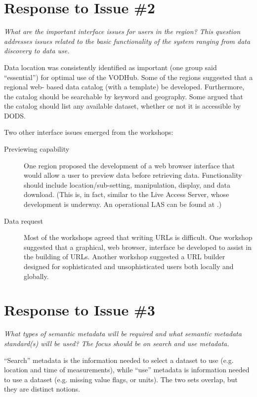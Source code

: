 \documentclass{report}
\newcommand{\pause}{\vspace{10pt}}
\begin{document}
\section{Response to Issue \#2}

\emph{What are the important interface issues for users in the region?  This
question addresses issues related to the basic functionality of the
system ranging from data discovery to data use.}\pause

Data location was consistently identified as important (one group said
``essential'') for optimal use of the VODHub.  Some of the regions
suggested that a regional web- based data catalog (with a template) be
developed.  Furthermore, the catalog should be searchable by keyword
and geography.  Some argued that the catalog should list any available
dataset, whether or not it is accessible by DODS.

Two other interface issues emerged from the workshops:

\begin{description}
\item[Previewing capability]  One region proposed the development of a
  web browser interface that would allow a user to preview data before
  retrieving data.  Functionality should include location/sub-setting,
  manipulation, display, and data download.  (This is, in fact,
  similar to the Live Access Server, whose development is underway.
  An operational LAS can be found at
  .)
  
\item[Data request] Most of the workshops agreed that writing URLs is
  difficult.  One workshop suggested that a graphical, web browser,
  interface be developed to assist in the building of URLs.  Another
  workshop suggested a URL builder designed for sophisticated and
  unsophisticated users both locally and globally.

\end{description}

\section{Response to Issue \#3}

\emph{What types of semantic metadata will be required and what semantic
metadata standard(s) will be used?  The focus should be on search and
use metadata.}\pause

``Search'' metadata is the information needed to select
a dataset to use (e.g. location and time of measurements), while
``use'' metadata is information needed to use a dataset (e.g.  missing
value flags, or units).  The two sets overlap, but they are distinct
notions.
\end{document}
